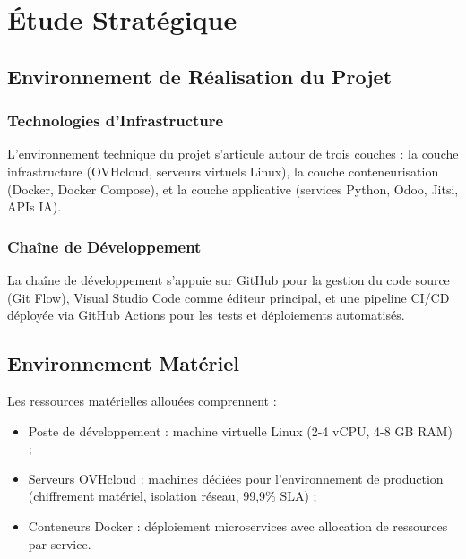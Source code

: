 \section{Étude Stratégique}

\subsection{Environnement de Réalisation du Projet}

\subsubsection{Technologies d'Infrastructure}
L'environnement technique du projet s'articule autour de trois couches : la couche infrastructure (OVHcloud, serveurs virtuels Linux), la couche conteneurisation (Docker, Docker Compose), et la couche applicative (services Python, Odoo, Jitsi, APIs IA).

\subsubsection{Chaîne de Développement}
La chaîne de développement s'appuie sur GitHub pour la gestion du code source (Git Flow), Visual Studio Code comme éditeur principal, et une pipeline CI/CD déployée via GitHub Actions pour les tests et déploiements automatisés.

\subsection{Environnement Matériel}
Les ressources matérielles allouées comprennent :
\begin{itemize}
    \item Poste de développement : machine virtuelle Linux (2-4 vCPU, 4-8 GB RAM) ;
    \item Serveurs OVHcloud : machines dédiées pour l'environnement de production (chiffrement matériel, isolation réseau, 99,9\% SLA) ;
    \item Conteneurs Docker : déploiement microservices avec allocation de ressources par service.
\end{itemize}

